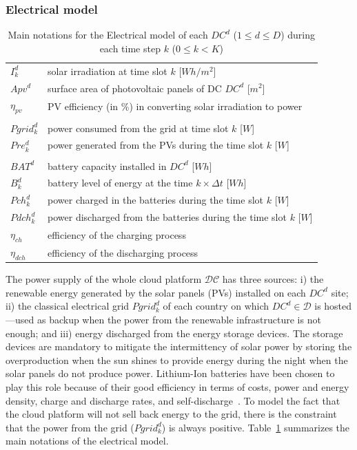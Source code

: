 \subsubsection{Electrical model}
\label{sec:electrical_model_ccgrid}


\begin{table}[t]
\caption{Main notations for the Electrical model of each $DC^d$ ($1\leq d\leq D$) during each time step $k$ ($0\leq k<K$)\label{table:variablesElec}}
\label{tab:notations_elec_model}
\begin{center}
\begin{tabular}{l p{11cm}}
$I^d_k$ & solar irradiation at time slot $k$ [$Wh/m^2$] \\
$Apv^d$ & surface area of photovoltaic panels of DC $DC^d$ [$m^2$] \\ 
$\eta_{pv}$ & PV efficiency (in \%) in converting solar irradiation to power \\
\\
$Pgrid_k^d$ & power consumed from the grid at time slot $k$ [$W$]\\
$Pre_k^d$ & power generated from the PVs during the time slot $k$ [$W$] \\
\\
$BAT^d$ & battery capacity installed in $DC^d$ [$Wh$] \\
$B_k^d$ & battery level of energy at the time $k\times\Delta t$ [$Wh$] \\
$Pch_k^d$ & power charged in the batteries during the time slot $k$ [$W$]\\
$Pdch_k^d$ & power discharged from the batteries during the time slot $k$ [$W$] \\
$\eta_{ch}$ & efficiency of the charging process  \\
$\eta_{dch}$ & efficiency of the discharging process  \\

\end{tabular}
\end{center}
\end{table}

The power supply of the whole cloud platform $\mathcal{DC}$ has three sources: i) the renewable energy generated by the solar panels (PVs) installed on each $DC^d$ site; ii) the classical electrical grid $Pgrid_k^d$ of each country on which $DC^d\in\mathcal{D}$ is hosted---used as backup when the power from the renewable infrastructure is not enough; and iii) energy discharged from the energy storage devices. The storage devices are mandatory to mitigate the intermittency of solar power by storing the overproduction when the sun shines to provide energy during the night when the solar panels do not produce power. Lithium-Ion batteries have been chosen to play this role because of their good efficiency in terms of costs, power and energy density, charge and discharge rates, and self-discharge~\cite{wang2012_EDCS}. To model the fact that the cloud platform will not sell back energy to the grid, there is the constraint that the power from the grid ($Pgrid^d_k$) is always positive. Table~\ref{tab:notations_elec_model} summarizes the main notations of the electrical model.


